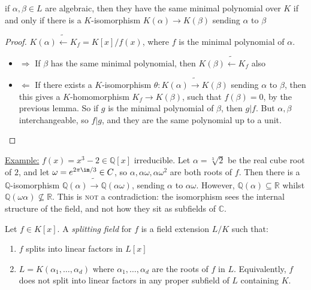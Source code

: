 \documentclass[a4paper, 10pt, twocolumn]{amsart}
\begin{document}
\begin{corollary}
if $\alpha, \beta \in L$ are algebraic, then they have the same minimal polynomial over $K$ if and only if there is a $K$-isomorphism $K(\alpha) \rightarrow K(\beta)$ sending $\alpha$ to $\beta$
\end{corollary}
\begin{proof}
$K(\alpha)\tilde{\longleftarrow} K_f = K[x]/f(x)$, where $f$ is the minimal polynomial of $\alpha$.
\begin{itemize}
\item{$\Longrightarrow$} If $\beta$ has the same minimal polynomial, then $K(\beta) \tilde{\longleftarrow} K_f$ also

\item{$\Longleftarrow$} If there exists a $K$-isomorphism $\theta:K(\alpha) \tilde{\longrightarrow} K(\beta)$ sending $\alpha$ to $\beta$, then this gives a $K$-homomorphism $K_f \rightarrow K(\beta)$, such that $f(\beta) = 0$, by the previous lemma. So if $g$ is the minimal polynomial of $\beta$, then $g|f$. But $\alpha, \beta$ interchangeable, so $f|g$, and they are the same polynomial up to a unit.
\end{itemize}
\end{proof}

\underline{Example:} $f(x) = x^3-2 \in \mathbb{Q}[x]$ irreducible. Let $\alpha=\sqrt[3]{2}$ be the real cube root of $2$, and let $\omega = e^{2\pi\im/3} \in C$, so $\alpha, \alpha\omega, \alpha\omega^2$ are both roots of $f$. Then there is a $\mathbb{Q}$-isomorphism $\mathbb{Q}(\alpha)\tilde{\longrightarrow} \mathbb{Q}(\alpha\omega)$, sending $\alpha$ to $\alpha\omega$. However, $\mathbb{Q}(\alpha)\subseteq \mathbb{R}$ whilst $\mathbb{Q}(\omega\alpha) \nsubseteq \mathbb{R}$. This is \textsc{not} a contradiction: the isomorphism sees the internal structure of the field, and not how they sit as subfields of $\mathbb{C}$.

Let $f\in K[x]$. A \emph{splitting field} for $f$ is a field extension $L/K$ such that:
\begin{enumerate}
\item $f$ splits into linear factors in $L[x]$
\item $L=K(\alpha_1, \ldots, \alpha_d)$ where $\alpha_1, \ldots, \alpha_d$ are the roots of $f$ in $L$. Equivalently, $f$ does not split into linear factors in any proper subfield of $L$ containing $K$.
\end{enumerate}
\end{document}
